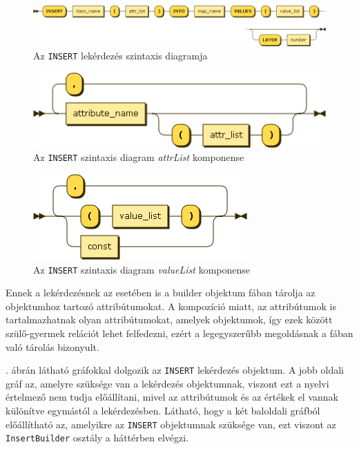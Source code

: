 \begin{figure}[htb]
	\begin{center}
		\includegraphics[scale=0.49]{images/insert_expr}
		\caption{Az \texttt{INSERT} lekérdezés szintaxis diagramja}
		\label{fig:insertSytnax}
	\end{center}
\end{figure}

\begin{figure}[htb]
	\begin{center}
		\includegraphics[scale=0.6]{images/attr_list}
		\caption{Az \texttt{INSERT} szintaxis diagram \textit{attrList} komponense}
		\label{fig:attrListSytnax}
	\end{center}
\end{figure}

\begin{figure}[htb]
	\begin{center}
		\includegraphics[scale=0.6]{images/value_list}
		\caption{Az \texttt{INSERT} szintaxis diagram \textit{valueList} komponense}
		\label{fig:valueListSytnax}
	\end{center}
\end{figure}

Ennek a lekérdezésnek az esetében is a builder objektum fában tárolja az objektumhoz tartozó attribútumokat. A kompozíció miatt, az attribútumok is tartalmazhatnak olyan attribútumokat, amelyek objektumok, így ezek között szülő-gyermek relációt lehet felfedezni, ezért a legegyszerűbb megoldásnak a fában való tárolás bizonyult.

. ábrán látható gráfokkal dolgozik az \texttt{INSERT} lekérdezés objektum. A jobb oldali gráf az, amelyre szüksége van a lekérdezés objektumnak, viszont ezt a nyelvi értelmező nem tudja előállítani, mivel az attribútumok és az értékek el vannak különítve egymástól a lekérdezésben. Látható, hogy a két baloldali gráfból előállítható az, amelyikre az \texttt{INSERT} objektumnak szüksége van, ezt viszont az \texttt{InsertBuilder} osztály a háttérben elvégzi.

